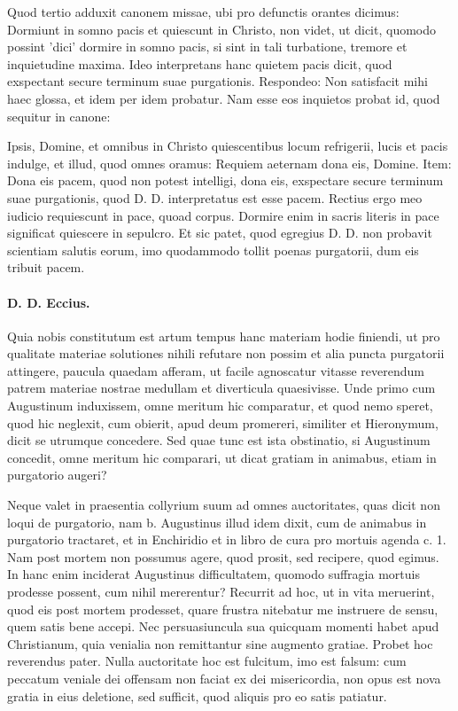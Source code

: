 Quod tertio adduxit canonem missae, ubi pro defunctis orantes dicimus: Dormiunt in somno pacis et quiescunt in Christo, non videt, ut dicit, quomodo possint 'dici' dormire in somno pacis, si sint in tali turbatione, tremore et inquietudine maxima. Ideo interpretans hanc quietem pacis dicit, quod exspectant secure terminum suae purgationis. Respondeo: Non satisfacit mihi haec glossa, et idem per idem probatur. Nam esse eos inquietos probat id, quod sequitur in canone:

Ipsis, Domine, et omnibus in Christo quiescentibus locum refrigerii, lucis et pacis indulge, et illud, quod omnes oramus: Requiem aeternam dona eis, Domine. Item: Dona eis pacem, quod non potest intelligi, dona eis, exspectare secure terminum suae purgationis, quod D. D. interpretatus est esse pacem. Rectius ergo meo iudicio requiescunt in pace, quoad corpus. Dormire enim in sacris literis in pace significat quiescere in sepulcro. \marginpar{\small[334]} Et sic patet, quod egregius D. D. non probavit scientiam salutis eorum, imo quodammodo tollit poenas purgatorii, dum eis tribuit pacem.

\paragraph*{D. D. Eccius.}

Quia nobis constitutum est artum tempus hanc materiam hodie finiendi, ut pro qualitate materiae solutiones nihili refutare non possim et alia puncta purgatorii attingere, paucula quaedam afferam, ut facile agnoscatur vitasse reverendum patrem materiae nostrae medullam et diverticula quaesivisse. Unde primo cum Augustinum induxissem, omne meritum hic comparatur, et quod nemo speret, quod hic neglexit, cum obierit, apud deum promereri, similiter et Hieronymum, dicit se utrumque concedere. Sed quae tunc est ista obstinatio, si Augustinum concedit, omne meritum hic comparari, ut dicat gratiam in animabus, etiam in purgatorio augeri?

Neque valet in praesentia collyrium suum ad omnes auctoritates, quas dicit non loqui de purgatorio, nam b. Augustinus illud idem dixit, cum de animabus in purgatorio tractaret, et in Enchiridio et in libro de cura pro mortuis agenda c. 1. Nam post mortem non possumus agere, quod prosit, sed recipere, quod egimus. In hanc enim inciderat Augustinus difficultatem, quomodo suffragia mortuis prodesse possent, cum nihil mererentur? Recurrit ad hoc, ut in vita meruerint, quod eis post mortem prodesset, quare frustra nitebatur me instruere de sensu, quem satis bene accepi. Nec persuasiuncula sua quicquam momenti habet apud Christianum, quia venialia non remittantur sine augmento gratiae. Probet hoc reverendus pater. Nulla auctoritate hoc est fulcitum, imo est falsum: cum peccatum veniale dei offensam non faciat ex dei misericordia, non opus est nova gratia in eius deletione, sed sufficit, quod aliquis pro eo satis patiatur.

